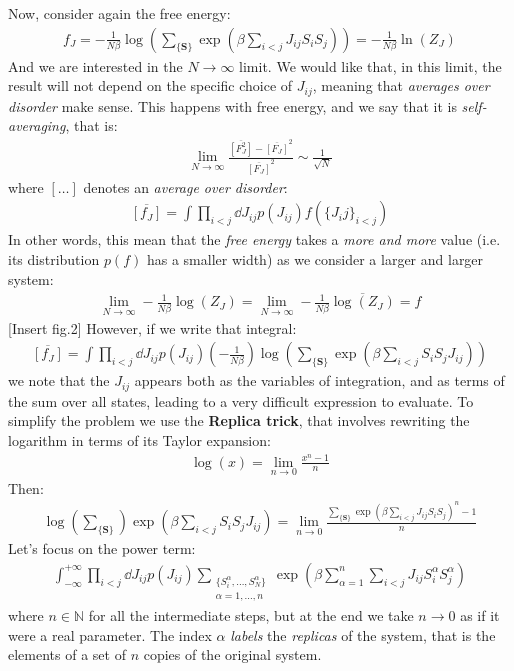 \documentclass[../template.tex]{subfiles}
\begin{document}
Now, consider again the free energy:
\begin{align*}
    f_J = -\frac{1}{N \beta} \log\left(\sum_{\{\bm{S}\}} \exp\left(\beta \sum_{i < j} J_{ij} S_i S_j\right)\right) = -\frac{1}{N \beta} \ln(Z_J) 
\end{align*}
And we are interested in the $N \to \infty$ limit. We would like that, in this limit, the result will not depend on the specific choice of $J_{ij}$, meaning that \textit{averages over disorder} make sense. This happens with free energy, and we say that it is \textit{self-averaging}, that is:
\begin{align*}
    \lim_{N \to \infty }  \frac{\overline{[F_J^2]} - \overline{[F_J]}^2}{\overline{[F_J]}^2} \sim \frac{1}{\sqrt{N}} 
\end{align*} 
where $[\dots]$ denotes an \textit{average over disorder}:
\begin{align*}
    \overline{[f_J]} = \int \prod_{i<j} \dd{J_{ij}} p(J_{ij}) f(\{J_
    ij\}_{i < j})
\end{align*}  
In other words, this mean that the \textit{free energy} takes a \textit{more and more}  value (i.e. its distribution $p(f)$ has a smaller width) as we consider a larger and larger system:
\begin{align*}
    \lim_{N \to \infty} -\frac{1}{N \beta} \log(Z_J) = \lim_{N \to \infty } - \frac{1}{N \beta} \overline{\log (Z_J)}   = f
\end{align*}
[Insert fig.2]
However, if we write that integral:
\begin{align*}
    \overline{[f_J]} = \int \prod_{i < j} \dd{J_{ij}} p(J_{ij}) \left(-\frac{1}{N \beta} \right)\log \left(\sum_{\{\bm{S}\}} \exp\left(\beta \sum_{i<j} S_i S_j J_{ij}\right)\right)
\end{align*}
we note that the $J_{ij}$ appears both as the variables of integration, and as terms of the sum over all states, leading to a very difficult expression to evaluate. To simplify the problem we use the \textbf{Replica trick}, that involves rewriting the logarithm in terms of its Taylor expansion:
\begin{align*}
    \log(x) = \lim_{n \to 0} \frac{x^n - 1 }{n} 
\end{align*}  
Then:
\begin{align*}
    \log\left(\sum_{\{\bm{S}\}}\right) \exp\left(\beta \sum_{i<j} S_i S_j J_{ij}\right) = \lim_{n \to 0} \frac{\displaystyle \sum_{\{\bm{S}\}} \exp\left(\beta \sum_{i<j} J_{ij} S_i S_j\right)^n - 1}{n} 
\end{align*}
Let's focus on the power term:
\begin{align}
    \int_{-\infty}^{+\infty} \prod_{i< j} \dd{J_{ij}} p(J_{ij}) \sum_{\substack{\{S^\alpha_i, \dots, S_N^\alpha\}\\\alpha = 1,\dots,n}} \exp \left(\beta \sum_{\alpha= 1 }^n \sum_{i<j} J_{ij} S^\alpha_i S_j^\alpha\right)
    \label{eqn:power}
\end{align}
where $n \in \mathbb{N}$ for all the intermediate steps, but at the end we take $n \to 0$ as if it were a real parameter. The index $\alpha$ \textit{labels} the \textit{replicas} of the system, that is the elements of a set of $n$ copies of the original system. 
\end{document}
